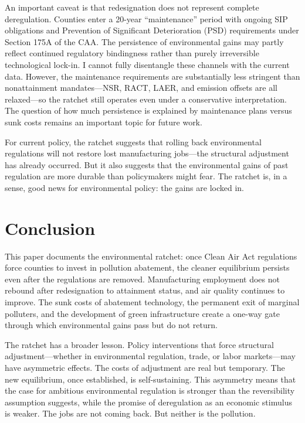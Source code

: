 \documentclass[12pt]{article}
\begin{document}
An important caveat is that redesignation does not represent complete deregulation. Counties enter a 20-year ``maintenance'' period with ongoing SIP obligations and Prevention of Significant Deterioration (PSD) requirements under Section 175A of the CAA. The persistence of environmental gains may partly reflect continued regulatory bindingness rather than purely irreversible technological lock-in. I cannot fully disentangle these channels with the current data. However, the maintenance requirements are substantially less stringent than nonattainment mandates---NSR, RACT, LAER, and emission offsets are all relaxed---so the ratchet still operates even under a conservative interpretation. The question of how much persistence is explained by maintenance plans versus sunk costs remains an important topic for future work.

For current policy, the ratchet suggests that rolling back environmental regulations will not restore lost manufacturing jobs---the structural adjustment has already occurred. But it also suggests that the environmental gains of past regulation are more durable than policymakers might fear. The ratchet is, in a sense, good news for environmental policy: the gains are locked in.


\section{Conclusion}
\label{sec:conclusion}

This paper documents the environmental ratchet: once Clean Air Act regulations force counties to invest in pollution abatement, the cleaner equilibrium persists even after the regulations are removed. Manufacturing employment does not rebound after redesignation to attainment status, and air quality continues to improve. The sunk costs of abatement technology, the permanent exit of marginal polluters, and the development of green infrastructure create a one-way gate through which environmental gains pass but do not return.

The ratchet has a broader lesson. Policy interventions that force structural adjustment---whether in environmental regulation, trade, or labor markets---may have asymmetric effects. The costs of adjustment are real but temporary. The new equilibrium, once established, is self-sustaining. This asymmetry means that the case for ambitious environmental regulation is stronger than the reversibility assumption suggests, while the promise of deregulation as an economic stimulus is weaker. The jobs are not coming back. But neither is the pollution.
\end{document}
